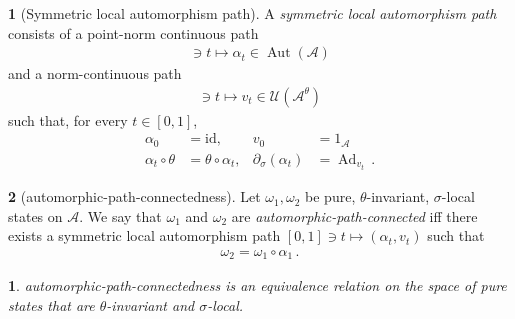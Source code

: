 \documentclass[a4paper,10pt]{article}
\numberwithin{equation}{section}
\theoremstyle{plain}
\theoremstyle{plain}
\theoremstyle{plain}
\theoremstyle{plain}
\theoremstyle{plain}
\newtheorem{claim}[claim]{\protect\claimname}
\theoremstyle{remark}
\theoremstyle{definition}
\newtheorem{defn}[defn]{\protect\definitionname}
\providecommand{\claimname}{Claim}
\providecommand{\definitionname}{Definition}
\newcommand{\calA}{\mathcal{A}}
\newcommand{\calU}{\mathcal{U}}
\newcommand{\Automorphisms}[1]{\operatorname{Aut}(#1)}
\newcommand{\Ad}[1]{\operatorname{Ad}_{#1}}
\newcommand{\eq}[1]{\begin{align*}#1\end{align*}}
\newcommand{\eql}[1]{\begin{align}#1\end{align}}
\begin{document}
\begin{defn}[Symmetric local automorphism path]
\label{def:symmetric local automorphism path}
A \emph{symmetric local automorphism path} consists of a point-norm
continuous path
\eq{
    [0,1]\ni t
    \longmapsto
    \alpha_t\in\Automorphisms{\calA}
}
and a norm-continuous path
\eq{
    [0,1]\ni t
    \longmapsto
    v_t\in\calU(\calA^\theta)
}
such that, for every \(t\in[0,1]\),
\eq{
    \alpha_0
    &=
    \mathrm{id},
    &
    v_0
    &=
    1_\calA\\
    \alpha_t\circ\theta
    &=
    \theta\circ\alpha_t,
    &
    \partial_\sigma(\alpha_t)
    &=
    \Ad{v_t}\,.
}
\end{defn}

\begin{defn}[automorphic-path-connectedness]
\label{def:automorphism path connectedness}
Let \(\omega_1,\omega_2\) be pure, \(\theta\)-invariant,
\(\sigma\)-local states on \(\calA\). We say that
\(\omega_1\) and \(\omega_2\) are \emph{automorphic-path-connected}
iff there exists a symmetric local automorphism path
\([0,1]\ni t\mapsto(\alpha_t,v_t)\) such that
\eql{
    \omega_2
    =
    \omega_1\circ\alpha_1\,.
}
\end{defn}

\begin{claim}
automorphic-path-connectedness is an equivalence relation on the
space of pure states that are \(\theta\)-invariant and
\(\sigma\)-local.
\end{claim}
\end{document}
